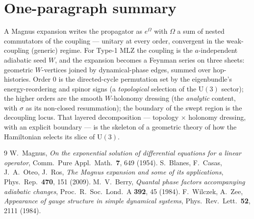 \documentclass[11pt]{article}
\newcommand{\U}{\mathrm{U}}
\begin{document}
\section{One-paragraph summary}
A Magnus expansion writes the propagator as $e^{\Omega}$ with $\Omega$ a sum of nested commutators of the
coupling --- unitary at every order, convergent in the weak-coupling (generic) regime. For Type-1 MLZ the
coupling is the $a$-independent adiabatic seed $W$, and the expansion becomes a Feynman series on three
sheets: geometric $W$-vertices joined by dynamical-phase edges, summed over hop-histories. Order $0$ is the
directed-cycle permutation set by the eigenbundle's energy-reordering and spinor signs (a \emph{topological}
selection of the $\U(3)$ sector); the higher orders are the smooth $W$-holonomy dressing (the
\emph{analytic} content, with $\sigma$ as its non-closed resummation); the boundary of the swept region is
the decoupling locus. That layered decomposition --- topology $\times$ holonomy dressing, with an explicit
boundary --- is the skeleton of a geometric theory of how the Hamiltonian selects its slice of $\U(3)$.

\begin{thebibliography}{9}
 W.~Magnus, \emph{On the exponential solution of differential equations for a linear
operator}, Comm.\ Pure Appl.\ Math.\ \textbf{7}, 649 (1954).
 S.~Blanes, F.~Casas, J.~A.~Oteo, J.~Ros, \emph{The Magnus expansion and some of
its applications}, Phys.\ Rep.\ \textbf{470}, 151 (2009).
 M.~V.~Berry, \emph{Quantal phase factors accompanying adiabatic changes}, Proc.\ R.\
Soc.\ Lond.\ A \textbf{392}, 45 (1984).
 F.~Wilczek, A.~Zee, \emph{Appearance of gauge structure in simple dynamical
systems}, Phys.\ Rev.\ Lett.\ \textbf{52}, 2111 (1984).
\end{thebibliography}
\end{document}
